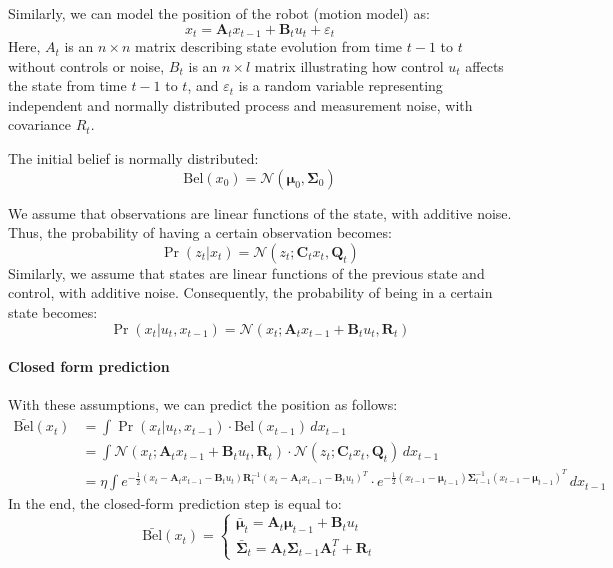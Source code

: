 Similarly, we can model the position of the robot (motion model) as:
\[x_t=\mathbf{A}_tx_{t-1}+\mathbf{B}_tu_t+\varepsilon_t\]
Here, $A_t$ is an $n\times n$ matrix describing state evolution from time $t-1$ to $t$ without controls or noise, $B_t$ is an $n\times l$ matrix illustrating how control $u_t$ affects the state from time $t-1$ to $t$, and $\varepsilon_t$ is a random variable representing independent and normally distributed process and measurement noise, with covariance $R_t$. 

The initial belief is normally distributed:
\[\text{Bel}(x_0)=\mathcal{N}(\boldsymbol{\mu}_0,\mathbf{\Sigma}_0)\]

We assume that observations are linear functions of the state, with additive noise. 
Thus, the probability of having a certain observation becomes:
\[\Pr(z_t|x_t)=\mathcal{N}(z_t;\mathbf{C}_tx_t,\mathbf{Q}_t)\]
Similarly, we assume that states are linear functions of the previous state and control, with additive noise. 
Consequently, the probability of being in a certain state becomes:
\[\Pr(x_t|u_t,x_{t-1})=\mathcal{N}(x_t;\mathbf{A}_tx_{t-1}+\mathbf{B}_tu_t,\mathbf{R}_t)\]

\paragraph*{Closed form prediction}
With these assumptions, we can predict the position as follows:
\begin{align*}
    \bar{\text{Bel}}(x_t)   &=\int\Pr(x_t|u_t,x_{t-1})\cdot\text{Bel}(x_{t-1})\,dx_{t-1} \\
                            &=\int\mathcal{N}(x_t;\mathbf{A}_tx_{t-1}+\mathbf{B}_tu_t,\mathbf{R}_t)\cdot\mathcal{N}(z_t;\mathbf{C}_tx_t,\mathbf{Q}_t)\,dx_{t-1} \\
                            &=\eta\int e^{-\frac{1}{2}(x_t-\mathbf{A}_tx_{t-1}-\mathbf{B}_tu_t)\mathbf{R}_t^{-1}(x_t-\mathbf{A}_tx_{t-1}-\mathbf{B}_tu_t)^T}\cdot e^{-\frac{1}{2}(x_{t-1}-\boldsymbol{\mu}_{t-1})\mathbf{\Sigma}_{t-1}^{-1}(x_{t-1}-\boldsymbol{\mu}_{t-1})^T}\,dx_{t-1}
\end{align*}
In the end, the closed-form prediction step is equal to:
\[\bar{\text{Bel}}(x_t)=\begin{cases}
    \bar{\boldsymbol{\mu}}_t=\mathbf{A}_t\boldsymbol{\mu}_{t-1}+\mathbf{B}_tu_t \\
    \bar{\mathbf{\Sigma}}_t=\mathbf{A}_t\mathbf{\Sigma}_{t-1}\mathbf{A}_t^T+\mathbf{R}_t
\end{cases}\]

